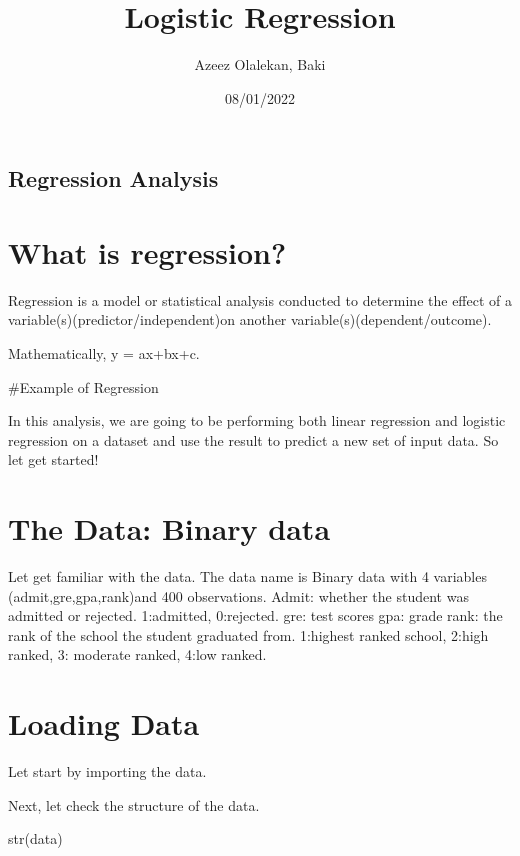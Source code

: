 \documentclass[
]{article}
\title{Logistic Regression}
\author{Azeez Olalekan, Baki}
\date{08/01/2022}
\newenvironment{Shaded}{\begin{snugshade}}{\end{snugshade}}
\newcommand{\FunctionTok}[1]{\textcolor[rgb]{0.00,0.00,0.00}{#1}}
\newcommand{\NormalTok}[1]{#1}
\begin{document}
\maketitle

\hypertarget{regression-analysis}{%
\subsection{Regression Analysis}\label{regression-analysis}}

\hypertarget{what-is-regression}{%
\section{What is regression?}\label{what-is-regression}}

Regression is a model or statistical analysis conducted to determine the
effect of a variable(s)(predictor/independent)on another
variable(s)(dependent/outcome).

Mathematically, y = ax+bx+c.

\#Example of Regression

In this analysis, we are going to be performing both linear regression
and logistic regression on a dataset and use the result to predict a new
set of input data. So let get started!

\hypertarget{the-data-binary-data}{%
\section{The Data: Binary data}\label{the-data-binary-data}}

Let get familiar with the data. The data name is Binary data with 4
variables (admit,gre,gpa,rank)and 400 observations. Admit: whether the
student was admitted or rejected. 1:admitted, 0:rejected. gre: test
scores gpa: grade rank: the rank of the school the student graduated
from. 1:highest ranked school, 2:high ranked, 3: moderate ranked, 4:low
ranked.

\hypertarget{loading-data}{%
\section{Loading Data}\label{loading-data}}

Let start by importing the data.

Next, let check the structure of the data.

\begin{Shaded}
\begin{Highlighting}[]
\FunctionTok{str}\NormalTok{(data)}
\end{Highlighting}
\end{Shaded}
\end{document}
